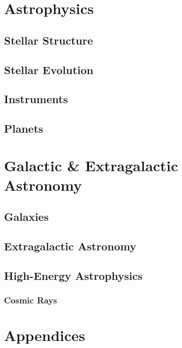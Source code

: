 \documentclass[../all_subjects_main.tex]{subfiles}
\begin{document}
\part{Astrophysics}

\chapter{Stellar Structure}

\chapter{Stellar Evolution}

\chapter{Instruments}

\chapter{Planets}


\part{Galactic \& Extragalactic Astronomy}

\chapter{Galaxies}

\chapter{Extragalactic Astronomy}

\chapter{High-Energy Astrophysics}
\section{Cosmic Rays}


\part{Appendices}

\appendix







\newpage

\end{document}

